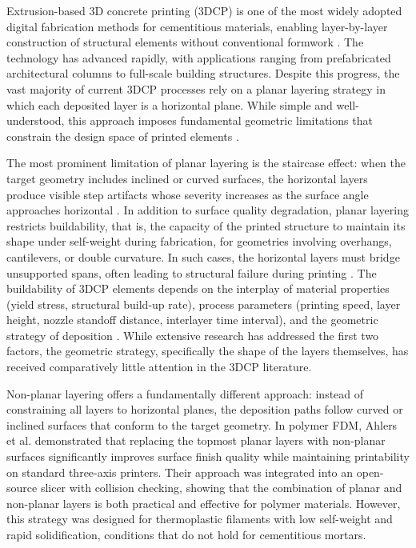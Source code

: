 \documentclass[conference]{IEEEtran}
\begin{document}
Extrusion-based 3D concrete printing (3DCP) is one of the most widely adopted digital fabrication methods for cementitious materials, enabling layer-by-layer construction of structural elements without conventional formwork \cite{bos_realities_2022}. The technology has advanced rapidly, with applications ranging from prefabricated architectural columns \cite{anton_3d_2021} to full-scale building structures. Despite this progress, the vast majority of current 3DCP processes rely on a planar layering strategy in which each deposited layer is a horizontal plane. While simple and well-understood, this approach imposes fundamental geometric limitations that constrain the design space of printed elements \cite{kiyani_influence_2025}.

The most prominent limitation of planar layering is the staircase effect: when the target geometry includes inclined or curved surfaces, the horizontal layers produce visible step artifacts whose severity increases as the surface angle approaches horizontal \cite{ahlers_3d_2019}. In addition to surface quality degradation, planar layering restricts buildability, that is, the capacity of the printed structure to maintain its shape under self-weight during fabrication, for geometries involving overhangs, cantilevers, or double curvature. In such cases, the horizontal layers must bridge unsupported spans, often leading to structural failure during printing \cite{bos_juxtaposing_2021, vele_enhancing_2024}. The buildability of 3DCP elements depends on the interplay of material properties (yield stress, structural build-up rate), process parameters (printing speed, layer height, nozzle standoff distance, interlayer time interval), and the geometric strategy of deposition \cite{wolfs_filament_2021, kiyani_influence_2025}. While extensive research has addressed the first two factors, the geometric strategy, specifically the shape of the layers themselves, has received comparatively little attention in the 3DCP literature.

Non-planar layering offers a fundamentally different approach: instead of constraining all layers to horizontal planes, the deposition paths follow curved or inclined surfaces that conform to the target geometry. In polymer FDM, Ahlers et al. \cite{ahlers_3d_2019} demonstrated that replacing the topmost planar layers with non-planar surfaces significantly improves surface finish quality while maintaining printability on standard three-axis printers. Their approach was integrated into an open-source slicer with collision checking, showing that the combination of planar and non-planar layers is both practical and effective for polymer materials. However, this strategy was designed for thermoplastic filaments with low self-weight and rapid solidification, conditions that do not hold for cementitious mortars.
\end{document}
